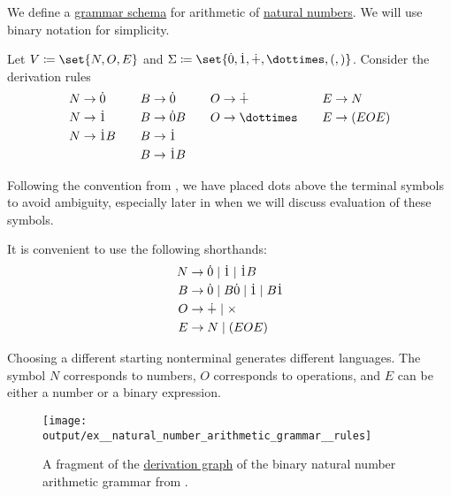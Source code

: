 \begin{example}\label{ex:natural_number_arithmetic_grammar/schema}
  We define a \hyperref[def:formal_grammar/schema]{grammar schema} for arithmetic of \hyperref[def:natural_numbers]{natural numbers}. We will use binary notation for simplicity.

  Let \( V \coloneqq \set{ N, O, E } \) and \( \Sigma \coloneqq \set{ \syn0, \syn1, \synplus, \syntimes, (,) } \). Consider the derivation rules
  \begin{equation}\label{eq:ex:natural_number_arithmetic_grammar/schema/simple}
    \begin{aligned}
      N &\to \syn0   & \quad B &\to \syn0   & \quad O &\to \synplus  & \quad E &\to N       \\
      N &\to \syn1   & \quad B &\to \syn0 B & \quad O &\to \syntimes & \quad E &\to (E O E) \\
      N &\to \syn1 B & \quad B &\to \syn1   & \quad   &              &         &            \\
        &            & \quad B &\to \syn1 B & \quad   &              &         &
    \end{aligned}
  \end{equation}

  Following the convention from , we have placed dots above the terminal symbols to avoid ambiguity, especially later in  when we will discuss evaluation of these symbols.

  It is convenient to use the following shorthands:
  \begin{equation}\label{eq:ex:natural_number_arithmetic_grammar/schema/shorthand}
    \begin{aligned}
      N &\to \dot{0} \mid \dot{1}   \mid \dot{1} B \\
      B &\to \dot{0} \mid B \dot{0} \mid \dot{1} \mid B \dot{1} \\
      O &\to \mathbin{\dotplus} \mid \times \\
      E &\to N     \mid (E O E)
    \end{aligned}
  \end{equation}

  Choosing a different starting nonterminal generates different languages. The symbol \( N \) corresponds to numbers, \( O \) corresponds to operations, and \( E \) can be either a number or a binary expression.

  \begin{figure}[!ht]
    \centering
    \texttt{[image: output/ex\_\_natural\_number\_arithmetic\_grammar\_\_rules]}
    \caption{A fragment of the \hyperref[def:formal_grammar/graph]{derivation graph} of the binary natural number arithmetic grammar from .}
    \label{fig:ex:natural_number_arithmetic_grammar/schema}
  \end{figure}
\end{example}

